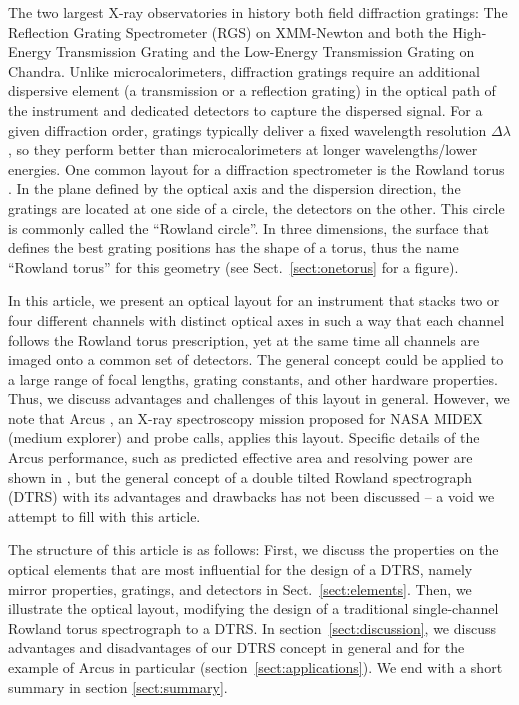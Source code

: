 \documentclass[linenumbers]{aastex631}
\begin{document}
The two largest X-ray observatories in history both field diffraction gratings: The Reflection Grating Spectrometer (RGS) on XMM-Newton \citep{2001A&A...365L...7D} and both the High-Energy Transmission Grating  \citep[HETG,][]{2005PASP..117.1144C} and the Low-Energy Transmission Grating \citep[LETG,][]{1997SPIE.3113..172P} on Chandra.
Unlike microcalorimeters, diffraction gratings require an additional dispersive element (a transmission or a reflection grating) in the optical path of the instrument and dedicated detectors to capture the dispersed signal. For a given diffraction order, gratings typically deliver a fixed wavelength resolution $\Delta \lambda$, so they perform better than microcalorimeters at longer wavelengths/lower energies. One common layout for a diffraction spectrometer is the Rowland torus \citep{Beuermann:78}. In the plane defined by the optical axis and the dispersion direction, the gratings are located at one side of a circle, the detectors on the other. This circle is commonly called the ``Rowland circle''. In three dimensions, the surface that defines the best grating positions has the shape of a torus, thus the name ``Rowland torus'' for this geometry (see Sect.~\ref{sect:onetorus} for a figure).

In this article, we present an optical layout for an instrument that stacks two or four different channels with distinct optical axes in such a way that each channel follows the Rowland torus prescription, yet at the same time all channels are imaged onto a common set of detectors. The general concept could be applied to a large range of focal lengths, grating constants, and other hardware properties. Thus, we discuss advantages and challenges of this layout in general. However, we note that Arcus \citep{2023SPIE12678E..0ES}, an X-ray spectroscopy mission proposed for NASA MIDEX (medium explorer) and probe calls, applies this layout. Specific details of the  Arcus performance, such as predicted effective area and resolving power are shown in \citet{2018SPIE10699E..6FG,2023SPIE12678E..1DG}, but the general concept of a double tilted Rowland spectrograph (DTRS) with its advantages and drawbacks has not been discussed -- a void we attempt to fill with this article.

The structure of this article is as follows: First, we discuss the properties on the optical elements that are most influential for the design of a DTRS, namely mirror properties, gratings, and detectors in Sect.~\ref{sect:elements}. Then, we illustrate the optical layout, modifying the design of a traditional single-channel Rowland torus spectrograph to a DTRS. In section~\ref{sect:discussion}, we discuss advantages and disadvantages of our DTRS concept in general and for the example of Arcus in particular (section~\ref{sect:applications}). We end with a short summary in section \ref{sect:summary}.
\end{document}
